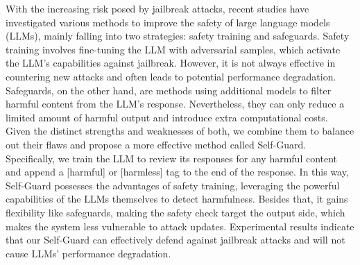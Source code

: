 With the increasing risk posed by jailbreak attacks, recent studies have investigated various methods to improve the safety of large language models (LLMs), mainly falling into two strategies: safety training and safeguards. Safety training involves fine-tuning the LLM with adversarial samples, which activate the LLM's capabilities against jailbreak. However, it is not always effective in countering new attacks and often leads to potential performance degradation. Safeguards, on the other hand, are methods using additional models to filter harmful content from the LLM's response. Nevertheless, they can only reduce a limited amount of harmful output and introduce extra computational costs. Given the distinct strengths and weaknesses of both, we combine them to balance out their flaws and propose a more effective method called Self-Guard. Specifically, we train the LLM to review its responses for any harmful content and append a [harmful] or [harmless] tag to the end of the response. In this way, Self-Guard possesses the advantages of safety training, leveraging the powerful capabilities of the LLMs themselves to detect harmfulness. Besides that, it gains flexibility like safeguards, making the safety check target the output side, which makes the system less vulnerable to attack updates. Experimental results indicate that our Self-Guard can effectively defend against jailbreak attacks and will not cause LLMs' performance degradation.